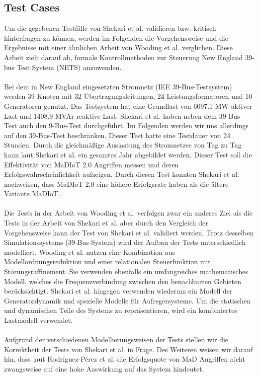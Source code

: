 \documentclass[
    a4paper,
    pagesize,
	pdftex,
    12pt,
]{scrartcl}
\begin{document}
\begin{multicols}{2}
\subsection{Test Cases}
Um die gegebenen Testfälle von Shekari et al.\cite{280016} validieren bzw. kritisch hinterfragen zu können, werden im Folgenden die Vorgehensweise und die Ergebnisse mit einer ähnlichen Arbeit von Wooding et al. verglichen\cite{wooding2023formal}. Diese Arbeit zielt darauf ab, formale Kontrollmethoden zur Steuerung New England 39-bus Test System (NETS) anzuwenden.\\ \\Bei dem in New England eingesetzten Stromnetz (IEE 39-Bus-Testsystem) werden 39 Knoten mit 32 Übertragungsleitungen, 24 Leistungsformatoren und 10 Generatoren genutzt. Das Testsystem hat eine Grundlast von 6097.1 MW aktiver Last und 1408.9 MVAr reaktive Last. Shekari et al. haben neben dem 39-Bus-Test auch den 9-Bus-Test durchgeführt. Im Folgenden werden wir uns allerdings auf den 39-Bus-Test beschränken. Dieser Test hatte eine Testdauer von 24 Stunden. Durch die gleichmäßige Auslastung des Stromnetzes von Tag zu Tag kann laut Shekari et al. ein gesamtes Jahr abgebildet werden. Dieser Test soll die Effektivität von MaDIoT 2.0 Angriffen messen und deren Erfolgswahrscheinlichkeit aufzeigen. Durch diesen Test konnten Shekari et al. nachweisen, dass MaDIoT 2.0 eine höhere Erfolgsrate haben als die ältere Variante MaDIoT.\\ \\Die Tests in der Arbeit von Wooding et al. verfolgen zwar ein anderes Ziel als die Tests in der Arbeit von Shekari et al. aber durch den Vergleich der Vorgehensweise kann der Test von Shekari et al. validiert werden. Trotz desselben Simulationssystems (39-Bus-System) wird der Aufbau der Tests unterschiedlich modelliert. Wooding et al. nutzen eine Kombination aus Modellordnungsreduktion und einer relationalen Steuerfunktion mit Störungsraffinement. Sie verwenden ebenfalls ein umfangreiches mathematisches Modell, welches die Frequenzverbindung zwischen den benachbarten Gebieten berücksichtigt. Shekari et al. hingegen verwenden wiederum ein Modell der Generatordynamik und spezielle Modelle für Aufregersysteme. Um die statischen und dynamischen Teile des Systems zu repräsentieren, wird ein kombiniertes Lastmodell verwendet.\\ \\Aufgrund der verschiedenen Modellierungsweisen der Tests stellen wir die Korrektheit der Tests von Shekari et al. in Frage. Des Weiteren weisen wir darauf hin, dass laut Rodríguez-Pérez et al. die Erfolgsquote von MaD Angriffen  nicht zwangsweise auf eine hohe Auswirkung auf das System hindeutet\cite{Rodriguez-Perez-confronting-thread}.

\end{multicols}
\end{document}
